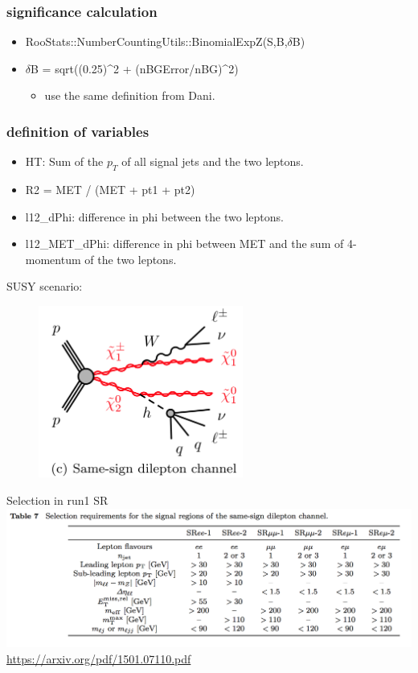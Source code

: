 \documentclass[mathserif,serif]{beamer}
\begin{document}
\begin{frame}
\frametitle{significance calculation}
\begin{itemize}
\item RooStats::NumberCountingUtils::BinomialExpZ(S,B,$\delta$B)
\item $\delta$B = sqrt((0.25)\^{}2 + (nBGError/nBG)\^{}2)
\begin{itemize}
\item use the same definition from Dani.
\end{itemize}
\end{itemize}
\end{frame}

\begin{frame}
\frametitle{definition of variables}
\normalsize
\begin{itemize}
\item HT: Sum of the $p_T$ of all signal jets and the two leptons.
\item R2 = MET / (MET + pt1 + pt2)
\item l12\_dPhi: difference in phi between the two leptons.
\item l12\_MET\_dPhi: difference in phi between MET and the sum of 4-momentum of the two leptons.
\end{itemize}
\end{frame}

\begin{frame}
\small
SUSY scenario:\\
\begin{figure}
\includegraphics[width=0.6\textwidth]{data/photo/Wh.png}
\end{figure}
\end{frame}

\begin{frame}{Selection in run1 SR}
\includegraphics[width=\textwidth]{data/photo/SRcutrun1.png} \\
\url{https://arxiv.org/pdf/1501.07110.pdf}
\end{frame}
\end{document}

